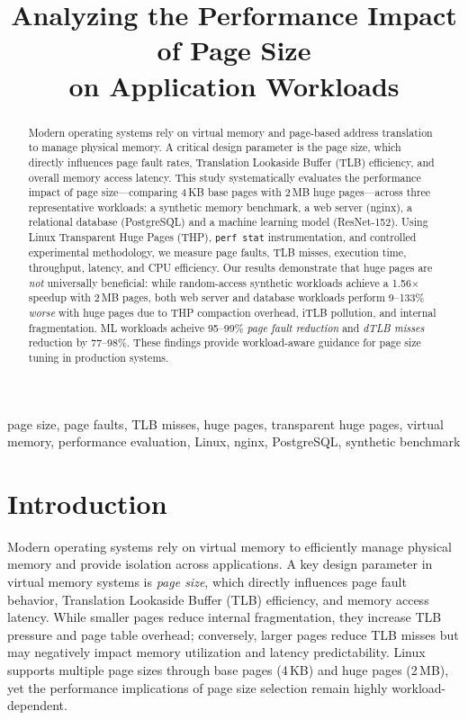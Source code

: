 \documentclass[conference]{IEEEtran}
\title{Analyzing the Performance Impact of Page Size \\on Application Workloads}
\author{
\IEEEauthorblockN{Abhash Tiwari MT2025002}
\IEEEauthorblockN{Uttkarsh Ranjan MT2025128}
\IEEEauthorblockA{
Department of Computer Science\\
International Institute of Information Technology, Bengaluru\\
}
}
\begin{document}
\maketitle

\begin{abstract}
Modern operating systems rely on virtual memory and page-based address translation to manage physical memory. A critical design parameter is the page size, which directly influences page fault rates, Translation Lookaside Buffer (TLB) efficiency, and overall memory access latency. This study systematically evaluates the performance impact of page size---comparing 4\,KB base pages with 2\,MB huge pages---across three representative workloads: a synthetic memory benchmark, a web server (nginx), a relational database (PostgreSQL) and a machine learning model (ResNet-152). Using Linux Transparent Huge Pages (THP), \texttt{perf stat} instrumentation, and controlled experimental methodology, we measure page faults, TLB misses, execution time, throughput, latency, and CPU efficiency. Our results demonstrate that huge pages are \emph{not} universally beneficial: while random-access synthetic workloads achieve a 1.56$\times$ speedup with 2\,MB pages, both web server and database workloads perform 9--133\% \emph{worse} with huge pages due to THP compaction overhead, iTLB pollution, and internal fragmentation. ML workloads acheive 95--99\% \emph{page fault reduction} and \emph{dTLB misses} reduction by 77--98\%.  These findings provide workload-aware guidance for page size tuning in production systems.
\end{abstract}

\begin{IEEEkeywords}
page size, page faults, TLB misses, huge pages, transparent huge pages, virtual memory, performance evaluation, Linux, nginx, PostgreSQL, synthetic benchmark
\end{IEEEkeywords}

\section{Introduction}

Modern operating systems rely on virtual memory to efficiently manage physical memory and provide isolation across applications. A key design parameter in virtual memory systems is \emph{page size}, which directly influences page fault behavior, Translation Lookaside Buffer (TLB) efficiency, and memory access latency. While smaller pages reduce internal fragmentation, they increase TLB pressure and page table overhead; conversely, larger pages reduce TLB misses but may negatively impact memory utilization and latency predictability. Linux supports multiple page sizes through base pages (4\,KB) and huge pages (2\,MB), yet the performance implications of page size selection remain highly workload-dependent.
\end{document}
